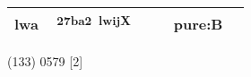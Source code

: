 \documentclass[14pt,a4paper]{scrartcl}
\begin{document}
\begin{longtable}[c]{@{}llllll@{}}
\begin{minipage}[t]{0.14\columnwidth}
lwa
\strut\end{minipage} &
\begin{minipage}[t]{0.14\columnwidth}\raggedright\strut
𧮢\textsuperscript{27ba2~lwijX}
\strut\end{minipage} &
\begin{minipage}[t]{0.14\columnwidth}\raggedright\strut
\strut\end{minipage} &
\begin{minipage}[t]{0.14\columnwidth}\raggedright\strut
\strut\end{minipage} &
\begin{minipage}[t]{0.14\columnwidth}\raggedright\strut
pure:B
\strut\end{minipage}\tabularnewline
\bottomrule
\end{longtable}

(133) 0579 {[}2{]}
\end{document}
